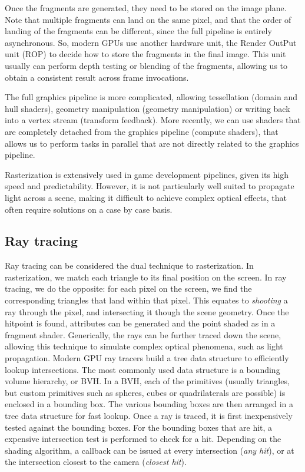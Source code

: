 Once the fragments are generated, they need to be stored on the image plane. Note that multiple fragments can land on the same pixel, and that the order of landing of the fragments can be different, since the full pipeline is entirely asynchronous. So, modern GPUs use another hardware unit, the Render OutPut unit (ROP) to decide how to store the fragments in the final image. This unit usually can perform depth testing or blending of the fragments, allowing us to obtain a consistent result across frame invocations.

The full graphics pipeline is more complicated, allowing tessellation (domain and hull shaders), geometry manipulation (geometry manipulation) or writing back into a vertex stream (transform feedback). More recently, we can use shaders that are completely detached from the graphics pipeline (compute shaders), that allows us to perform tasks in parallel that are not directly related to the graphics pipeline. 

Rasterization is extensively used in game development pipelines, given its high speed and predictability. However, it is not particularly well suited to propagate light across a scene, making it difficult to achieve complex optical effects, that often require solutions on a case by case basis.

\subsection{Ray tracing}
Ray tracing can be considered the dual technique to rasterization. In rasterization, we match each triangle to its final position on the screen. In ray tracing, we do the opposite: for each pixel on the screen, we find the corresponding triangles that land within that pixel. This equates to \emph{shooting} a ray through the pixel, and intersecting it though the scene geometry. Once the hitpoint is found, attributes can be generated and the point shaded as in a fragment shader. Generically, the rays can be further traced down the scene, allowing this technique to simulate complex optical phenomena, such as light propagation. 
Modern GPU ray tracers build a tree data structure to efficiently lookup intersections. The most commonly used data structure is a bounding volume hierarchy, or BVH. In a BVH, each of the primitives (usually triangles, but custom primitives such as spheres, cubes or quadrilaterals are possible) is enclosed in a bounding box. The various bounding boxes are then arranged in a tree data structure for fast lookup. Once a ray is traced, it is first inexpensively tested against the bounding boxes. For the bounding boxes that are hit, a expensive intersection test is performed to check for a hit. Depending on the shading algorithm, a callback can be issued at every intersection (\emph{any hit}), or at the intersection closest to the camera (\emph{closest hit}). 

